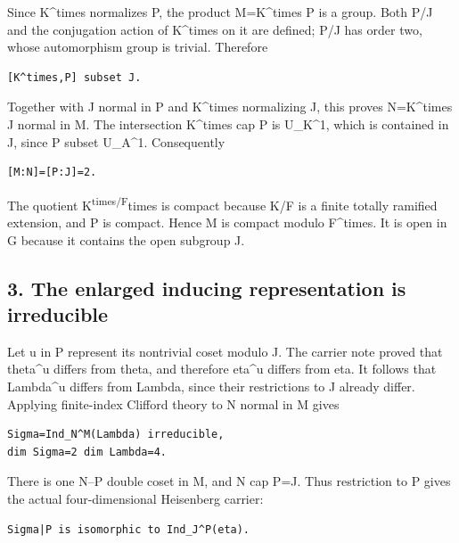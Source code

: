 Since K\^{}times normalizes P, the product M=K\^{}times P is a group.
Both P/J and the conjugation action of K\^{}times on it are defined; P/J
has order two, whose automorphism group is trivial. Therefore

\begin{Verbatim}[fontsize=\small,breaklines=true,breakanywhere=true]
[K^times,P] subset J.
\end{Verbatim}

Together with J normal in P and K\^{}times normalizing J, this proves
N=K\^{}times J normal in M. The intersection K\^{}times cap P is
U\_K\^{}1, which is contained in J, since P subset U\_A\^{}1.
Consequently

\begin{Verbatim}[fontsize=\small,breaklines=true,breakanywhere=true]
[M:N]=[P:J]=2.
\end{Verbatim}

The quotient K\textsuperscript{times/F}times is compact because K/F is a
finite totally ramified extension, and P is compact. Hence M is compact
modulo F\^{}times. It is open in G because it contains the open subgroup
J.

\hypertarget{rank4_stages-the-enlarged-inducing-representation-is-irreducible}{%
\subsection{3. The enlarged inducing representation is
irreducible}\label{rank4_stages-the-enlarged-inducing-representation-is-irreducible}}

Let u in P represent its nontrivial coset modulo J. The carrier note
proved that theta\^{}u differs from theta, and therefore eta\^{}u
differs from eta. It follows that Lambda\^{}u differs from Lambda, since
their restrictions to J already differ. Applying finite-index Clifford
theory to N normal in M gives

\begin{Verbatim}[fontsize=\small,breaklines=true,breakanywhere=true]
Sigma=Ind_N^M(Lambda) irreducible,
dim Sigma=2 dim Lambda=4.
\end{Verbatim}

There is one N--P double coset in M, and N cap P=J. Thus restriction to
P gives the actual four-dimensional Heisenberg carrier:

\begin{Verbatim}[fontsize=\small,breaklines=true,breakanywhere=true]
Sigma|P is isomorphic to Ind_J^P(eta).
\end{Verbatim}


